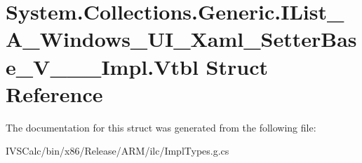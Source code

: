\hypertarget{struct_system_1_1_collections_1_1_generic_1_1_i_list___a___windows___u_i___xaml___setter_base___v_______impl_1_1_vtbl}{}\section{System.\+Collections.\+Generic.\+I\+List\+\_\+\+A\+\_\+\+Windows\+\_\+\+U\+I\+\_\+\+Xaml\+\_\+\+Setter\+Base\+\_\+\+V\+\_\+\+\_\+\+\_\+\+Impl.\+Vtbl Struct Reference}
\label{struct_system_1_1_collections_1_1_generic_1_1_i_list___a___windows___u_i___xaml___setter_base___v_______impl_1_1_vtbl}


The documentation for this struct was generated from the following file\+:\begin{DoxyCompactItemize}
\item 
I\+V\+S\+Calc/bin/x86/\+Release/\+A\+R\+M/ilc/Impl\+Types.\+g.\+cs\end{DoxyCompactItemize}
